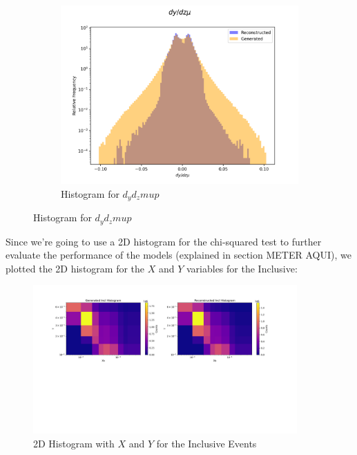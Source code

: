 \documentclass{article}
\begin{document}
\begin{figure}[H]
    \centering
    \begin{subfigure}[b]{0.45\textwidth}
        \includegraphics[width=\textwidth]{graphs/incl_dy_dz_mu.png}
        \caption{Histogram for $d_yd_zmup$}
        \label{fig:incl_Angle_mu}
    \end{subfigure}
    \caption{Histogram for $d_yd_zmup$}
\end{figure}

Since we're going to use a 2D histogram for the chi-squared test to further evaluate the performance of the models (explained in section METER AQUI), we plotted the 2D histogram for the $X$ and $Y$ variables for the Inclusive:

\begin{figure}[H]
    \centering
    \includegraphics[width=0.9\textwidth]{graphs/incl_xb_y.png}
    \caption{2D Histogram with $X$ and $Y$ for the Inclusive Events}
    \label{fig:inclusive_2D_histogram}
\end{figure}
\end{document}
